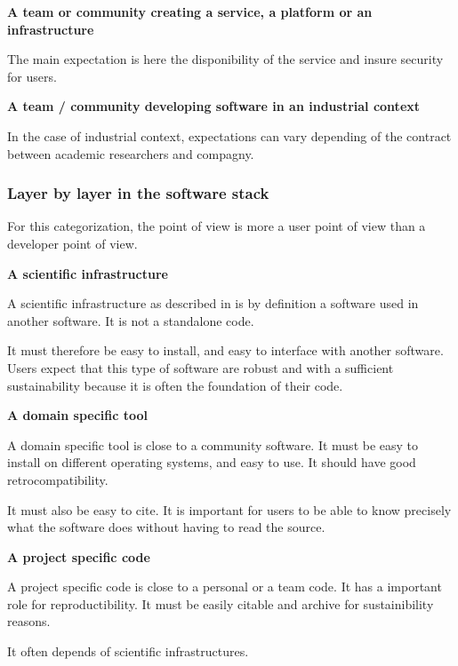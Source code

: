 \textbf{A team or community creating a service, a platform or an
  infrastructure}

The main expectation is here the disponibility of the service and
insure security for users.

\textbf{A team / community developing software in an industrial
  context}

In the case of industrial context, expectations can vary depending of
the contract between academic researchers and compagny.

\subsubsection{Layer by layer in the software stack}

For this categorization, the point of view is more a user point of
view than a developer point of view.

\textbf{A scientific infrastructure}

A scientific infrastructure as described in \cite{hinsen2019} is by
definition a software used in another software. It is not a standalone
code.

It must therefore be easy to install, and easy to interface with
another software.
Users expect that this type of software are robust and with a
sufficient sustainability because it is often the foundation of their code.

\textbf{A domain specific tool}

A domain specific tool is close to a community software. It must be
easy to install on different operating systems, and easy to use. It
should have good retrocompatibility.

It must also be easy to cite. It is important for users to be able to
know precisely what the software does without having to read the source. 

\textbf{A project specific code}

A project specific code is close to a personal or a team code. It has
a important role
for reproductibility. It must be easily citable and archive for
sustainibility reasons.

It often depends of scientific infrastructures.
